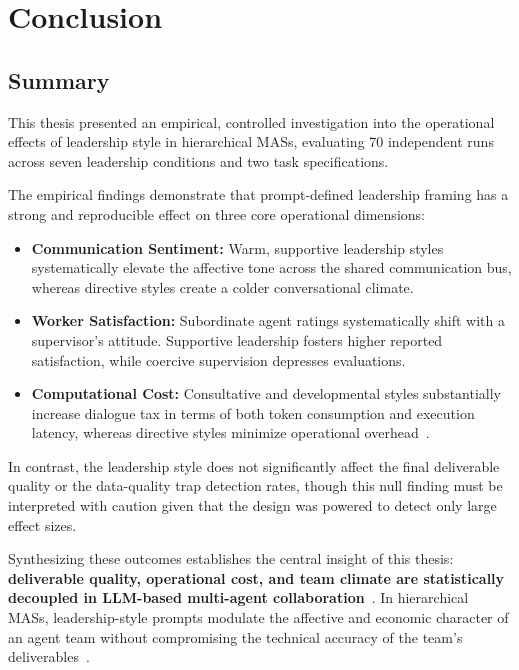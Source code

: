 \chapter{Conclusion}
\label{chap:conclusion}

\section{Summary}
\label{sec:summary}

This thesis presented an empirical, controlled investigation into the operational effects of leadership style in hierarchical \acp{MAS}, evaluating 70 independent runs across seven leadership conditions and two task specifications.

The empirical findings demonstrate that prompt-defined leadership framing has a strong and reproducible effect on three core operational dimensions:
\begin{itemize}
    \item \textbf{Communication Sentiment:} Warm, supportive leadership styles systematically elevate the affective tone across the shared communication bus, whereas directive styles create a colder conversational climate.
    \item \textbf{Worker Satisfaction:} Subordinate agent ratings systematically shift with a supervisor's attitude. Supportive leadership fosters higher reported satisfaction, while coercive supervision depresses evaluations.
    \item \textbf{Computational Cost:} Consultative and developmental styles substantially increase dialogue tax in terms of both token consumption and execution latency, whereas directive styles minimize operational overhead~\cite{zhang2024cutcrapeconomicalcommunication}.
\end{itemize}

In contrast, the leadership style does not significantly affect the final deliverable quality or the data-quality trap detection rates, though this null finding must be interpreted with caution given that the design was powered to detect only large effect sizes.

Synthesizing these outcomes establishes the central insight of this thesis: \textbf{deliverable quality, operational cost, and team climate are statistically decoupled in \ac{LLM}-based multi-agent collaboration}~\cite{kwak2026leadershipcoordinationcontrolbehavioral}.
In hierarchical \acp{MAS}, leadership-style prompts modulate the affective and economic character of an agent team without compromising the technical accuracy of the team's deliverables~\cite{white2023promptpatterncatalogenhance, kwak2026leadershipcoordinationcontrolbehavioral}.

